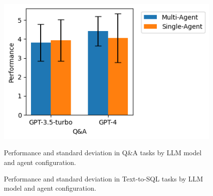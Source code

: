                 \begin{figure}[h]
                    \centering
                    \begin{minipage}{.48\textwidth}
                        \centering                
                            \includegraphics[width=1\linewidth]{images/performance_QA.png}
                        \caption{Performance and standard deviation in Q\&A tasks by LLM model and agent configuration.}
                        \label{fig:performance_QA}
                    \end{minipage}
                    \hspace{0.2cm}
                    \begin{minipage}{.48\textwidth}
                        \centering
                        \caption{Performance and standard deviation in Text-to-SQL tasks by LLM model and agent configuration.}
                        \label{fig:performance_text2sql}
                    \end{minipage}%
                \end{figure}


